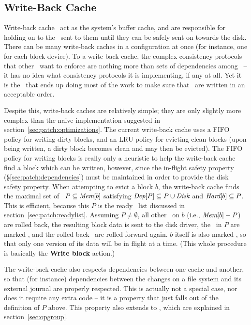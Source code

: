 \subsection{Write-Back Cache}
\label{sec:using:wbcache}

Write-back cache \modules\ act as the system's buffer cache, and are responsible
for holding on to the \chdescs\ sent to them until they can be safely sent on
towards the disk. There can be many write-back caches in a configuration at once
(for instance, one for each block device). To a write-back cache, the complex
consistency protocols that other \modules\ want to enforce are nothing more than
sets of dependencies among \chdescs\ -- it has no idea what consistency
protocols it is implementing, if any at all. Yet it is the \module\ that ends up
doing most of the work to make sure that \chdescs\ are written in an acceptable
order.

Despite this, write-back caches are relatively simple; they are only slightly
more complex than the naive implementation suggested in
section~\ref{sec:patch:optimizations}. The current write-back cache uses a FIFO
policy for writing dirty blocks, and an LRU policy for evicting clean blocks
(upon being written, a dirty block becomes clean and may then be evicted).
%
The FIFO policy for writing blocks is really only a heuristic to help the
write-back cache find a block which can be written, however, since the in-flight
safety property (\S\ref{sec:patch:dependencies}) must be maintained in order to
provide the disk safety property. When attempting to evict a block $b$, the
write-back cache finds the maximal set of \chdescs\ $P \subseteq \PMem[b]$
satisfying
%
$\PDepset{P} \subseteq P \cup \PDisk$ and $\PHard[b] \subseteq P$.
%
This is efficient, because this $P$ is the ready \chdesc\ list discussed in
section~\ref{sec:patch:readylist}.
%
Assuming $P \neq \emptyset$, all other \chdescs\ on $b$ (i.e., $\PMem[b] - P$)
are rolled back, the resulting block data is sent to the disk driver, the
\chdescs\ in $P$ are marked \PInfst, and the rolled-back \chdescs\ are rolled
forward again. $b$ itself is also marked \PInfst, so that only one version of
its data will be in flight at a time. (This whole procedure is basically the
\textbf{Write block} action.)

The write-back cache also respects dependencies between one cache and another,
so that (for instance) dependencies between the changes on a file system and its
external journal are properly respected. This is actually not a special case,
nor does it require any extra code -- it is a property that just falls out of
the definition of $P$ above. This property also extends to \opgroups, which are
explained in section~\ref{sec:opgroup}.
